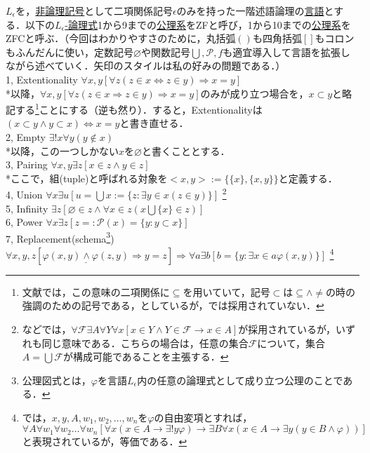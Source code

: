 \documentclass[uplatex, 12pt, a4paper, dvipdfmx]{jsreport}
\begin{document}
\begin{shadebox}
\begin{definition}
	$L_\epsilon$を，\underline{非論理記号}として二項関係記号$\epsilon$のみを持った一階述語論理の\underline{言語}とする．以下の\underline{$L_\epsilon$-論理式}1から9までの\underline{公理系}をZFと呼び，1から10までの\underline{公理系}をZFCと呼ぶ．（今回はわかりやすさのために，丸括弧$()$も四角括弧$[]$もコロンもふんだんに使い，定数記号$\varnothing$や関数記号$\bigcup , \mathcal{P}, f$も適宜導入して言語を拡張しながら述べていく．矢印のスタイルは私の好みの問題である．）\\
	\rm{1, Extentionality}   $\forall x,y [\forall z(z\in x \Longleftrightarrow z\in y) \Longrightarrow x=y]$\\
	\hspace{5mm}*以降，$\forall x,y [\forall z(z\in x \Longrightarrow z\in y) \Longrightarrow x=y]$のみが成り立つ場合を，$x\subset y$と略記する\footnote{文献\cite{吉田洋一}では，この意味の二項関係に$\subseteq$を用いていて，記号$\subset$は$\subseteq \wedge \neq$の時の強調のための記号である，としているが，\cite{須之内治男}\cite{赤摂也}では採用されていない．}ことにする（逆も然り）．すると，Extentionalityは$(x\subset y \wedge y\subset x)\Longleftrightarrow x=y$と書き直せる．\\
	2, \rm{Empty}   $\exists ! x \forall y (y\notin x)$\\
	\hspace{5mm}*以降，この一つしかない$x$を$\varnothing$と書くこととする．\\
	3, \rm{Pairing}   $\forall x,y \exists z [x\in z \wedge y\in z ]$\\
	\hspace{5mm}*ここで，組(tuple)と呼ばれる対象を$<x,y>:=\{ \{ x\} ,\{ x,y\} \}$と定義する．\\
	4, \rm{Union}  \; $\forall x \exists u [u=\bigcup x := \{ z:\exists y \in x (z\in y)\} ]$ \footnote{\cite{Kunen}などでは，$\forall \mathcal{F} \exists A \forall Y \forall x [x\in Y \wedge Y\in \mathcal{F}\longrightarrow x\in A]$が採用されているが，いずれも同じ意味である．こちらの場合は，任意の集合$\mathcal{F}$について，集合$A=\bigcup \mathcal{F}$が構成可能であることを主張する．} \\
	5, \rm{Infinity}   $\exists z [\varnothing \in z \wedge \forall x \in z (x\bigcup \{ x \} \in z)]$\\
	6, \rm{Power}   $\forall x \exists z [z=:\mathcal{P} (x) = \{ y:y \subset x \} ]$\\
	7, \rm{Replacement(schema\footnote{公理図式とは，$\varphi$を言語$L_\epsilon$内の任意の論理式として成り立つ公理のことである．})}   $\forall x,y,z [\underline{\varphi(x,y) \wedge \varphi (z,y)} \Longrightarrow y=z] \Longrightarrow \forall a \exists b [b=\{ y:\exists x\in a \varphi (x,y)\} ]$ \footnote{\cite{Kunen}では，$x,y,A,w_1,w_2,\dots,w_n$を$\varphi$の自由変項とすれば，$\forall A \forall w_1 \forall w_2 \dots \forall w_n [\forall x (x\in A \longrightarrow \exists ! y \varphi) \longrightarrow \exists B \forall x (x\in A \longrightarrow \exists y (y\in B \wedge \varphi))]$と表現されているが，等価である．} \\

\end{definition}
\end{shadebox}
\end{document}
